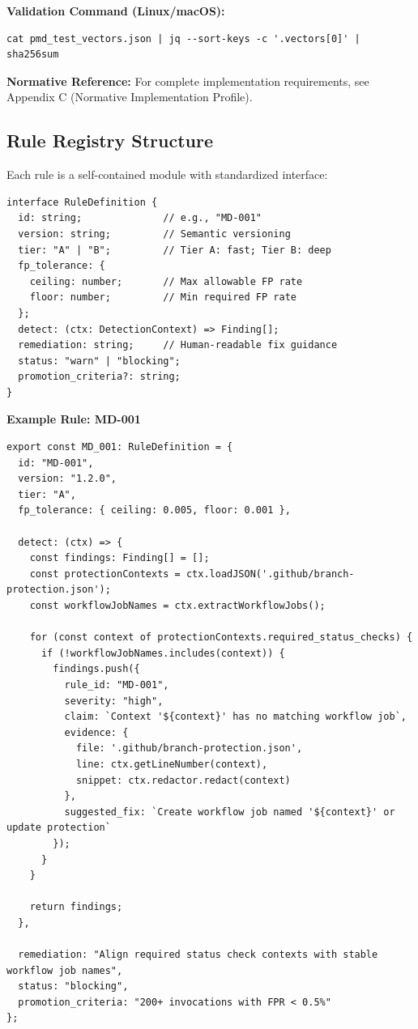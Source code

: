 \documentclass[11pt,a4paper]{article}
\begin{document}
\textbf{Validation Command (Linux/macOS):}
\begin{verbatim}
cat pmd_test_vectors.json | jq --sort-keys -c '.vectors[0]' | sha256sum
\end{verbatim}

\textbf{Normative Reference:} For complete implementation requirements, 
see Appendix C (Normative Implementation Profile).

\subsection{Rule Registry Structure}

Each rule is a self-contained module with standardized interface:

\begin{verbatim}
interface RuleDefinition {
  id: string;              // e.g., "MD-001"
  version: string;         // Semantic versioning
  tier: "A" | "B";         // Tier A: fast; Tier B: deep
  fp_tolerance: {
    ceiling: number;       // Max allowable FP rate
    floor: number;         // Min required FP rate
  };
  detect: (ctx: DetectionContext) => Finding[];
  remediation: string;     // Human-readable fix guidance
  status: "warn" | "blocking";
  promotion_criteria?: string;
}
\end{verbatim}

\textbf{Example Rule: MD-001}

\begin{verbatim}
export const MD_001: RuleDefinition = {
  id: "MD-001",
  version: "1.2.0",
  tier: "A",
  fp_tolerance: { ceiling: 0.005, floor: 0.001 },
  
  detect: (ctx) => {
    const findings: Finding[] = [];
    const protectionContexts = ctx.loadJSON('.github/branch-protection.json');
    const workflowJobNames = ctx.extractWorkflowJobs();
    
    for (const context of protectionContexts.required_status_checks) {
      if (!workflowJobNames.includes(context)) {
        findings.push({
          rule_id: "MD-001",
          severity: "high",
          claim: `Context '${context}' has no matching workflow job`,
          evidence: {
            file: '.github/branch-protection.json',
            line: ctx.getLineNumber(context),
            snippet: ctx.redactor.redact(context)
          },
          suggested_fix: `Create workflow job named '${context}' or update protection`
        });
      }
    }
    
    return findings;
  },
  
  remediation: "Align required status check contexts with stable workflow job names",
  status: "blocking",
  promotion_criteria: "200+ invocations with FPR < 0.5%"
};
\end{verbatim}
\end{document}
